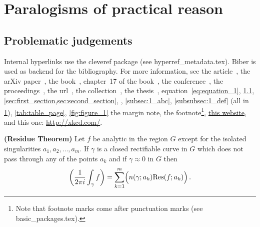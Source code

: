\chapter{Paralogisms of practical reason}\label{ch:1_chapter}



\section{Problematic judgements}\label{sec:first_section}
	
	Internal hyperlinks use the cleveref package (see hyperref\_metadata.tex). Biber is used as backend for the bibliography.
	For more information, see
	the article~\cite{Heidegger:1410}, 
	the arXiv paper~\cite{Schumpeter:2015}, 
	the book~\cite{Nietzsche:2014}, 
	chapter~17 of the book~\cite{Adorno:2014}, 
	the conference~\cite{Schopenhauer:2009}, 
	the proceedings~\cite{Feuerbach:1949}, 
	the url~\cite{Wittgenstein:2015}, 
	the collection~\cite{Popper:2008}, 
	the thesis~\cite{Carnap:2004}, 
	equation~\cref{eq:equation_1},
	\cref{sec:first_section}, 
	\cref{sec:first_section,sec:second_section}, 
	, 
	\cref{subsec:1_abc}, 
	\cref{subsubsec:1_def} (all in \cref{ch:1_chapter}),
	\cref{tab:table_page},
	\cref{fig:figure_1}
	the margin note,
	the footnote\footnote{Note that footnote marks come after punctuation marks (see basic\_packages.tex).},
	\href{http://nraontherecord.org/chuck-norris/}{this website},
	and this one: \url{http://xkcd.com/}.
	\begin{theorem}
		\textbf{(Residue Theorem)}
		Let $f$ be analytic in the region $G$ except for the isolated singularities $a_1,a_2,\ldots,a_m$. If $\gamma$ is a closed rectifiable curve in $G$ which does not pass through any of the points $a_k$ and if $\gamma\approx 0$ in $G$ then 
		\begin{equation}
			\paren*{ %
			\frac{1}{2\pi i}\int_\gamma f}
			= \sum_{k=1}^m \paren[\Big]{   %
					n(\gamma;a_k) \text{Res}
					\paren{f;a_k}  %
				}	\,.
		\end{equation}
	\end{theorem}
	
